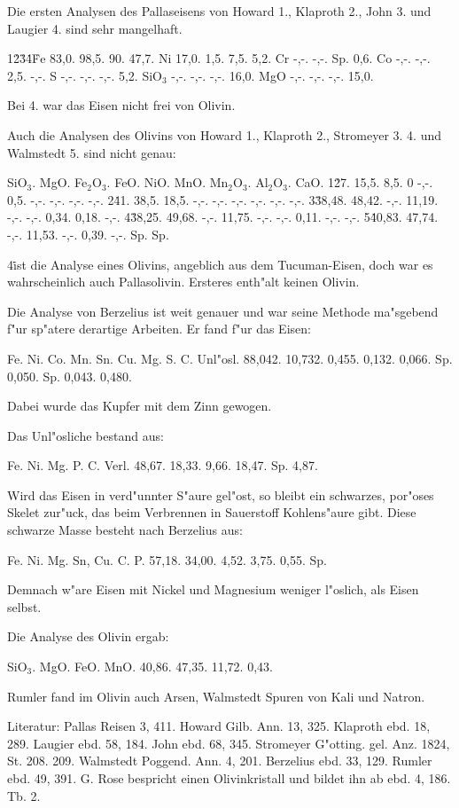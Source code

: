 \documentclass[a4paper, 11pt, oneside]{article}
\begin{document}
Die ersten Analysen des Pallaseisens von Howard 1., Klaproth 2., John 3. und Laugier 4. sind sehr mangelhaft.

1\. 2\. 3\. 4\.  
Fe 83,0. 98,5. 90. 47,7.  
Ni 17,0. 1,5. 7,5. 5,2.  
Cr -,-. -,-. Sp. 0,6.  
Co -,-. -,-. 2,5. -,-.  
S -,-. -,-. -,-. 5,2.  
SiO$_{3}$ -,-. -,-. -,-. 16,0.  
MgO -,-. -,-. -,-. 15,0.

Bei 4. war das Eisen nicht frei von Olivin.

Auch die Analysen des Olivins von Howard 1., Klaproth 2., Stromeyer 3. 4. und Walmstedt 5. sind nicht genau:

SiO$_{3}$. MgO. Fe$_{2}$O$_{3}$. FeO. NiO. MnO. Mn$_{2}$O$_{3}$. Al$_{2}$O$_{3}$. CaO.  
1\. 27. 15,5. 8,5. 0 -,-. 0,5. -,-. -,-. -,-. -,-.  
2\. 41. 38,5. 18,5. -,-. -,-. -,-. -,-. -,-. -,-.  
3\. 38,48. 48,42. -,-. 11,19. -,-. -,-. 0,34. 0,18. -,-.  
4\. 38,25. 49,68. -,-. 11,75. -,-. -,-. 0,11. -,-. -,-.  
5\. 40,83. 47,74. -,-. 11,53. -,-. 0,39. -,-. Sp. Sp.  

4\. ist die Analyse eines Olivins, angeblich aus dem Tucuman-Eisen, doch war es wahrscheinlich auch Pallasolivin. Ersteres enth"alt keinen Olivin.

Die Analyse von Berzelius ist weit genauer und war seine Methode ma"sgebend f"ur sp"atere derartige Arbeiten. Er fand f"ur das Eisen:

Fe. Ni. Co. Mn. Sn. Cu. Mg. S. C. Unl"osl.  
88,042. 10,732. 0,455. 0,132. 0,066. Sp. 0,050. Sp. 0,043. 0,480.

Dabei wurde das Kupfer mit dem Zinn gewogen.

Das Unl"osliche bestand aus:

Fe. Ni. Mg. P. C. Verl.  
48,67. 18,33. 9,66. 18,47. Sp. 4,87.

Wird das Eisen in verd"unnter S"aure gel"ost, so bleibt ein schwarzes, por"oses Skelet zur"uck, das beim Verbrennen in Sauerstoff Kohlens"aure gibt. Diese schwarze Masse besteht nach Berzelius aus:

Fe. Ni. Mg. Sn, Cu. C. P.
57,18. 34,00. 4,52. 3,75. 0,55. Sp.

Demnach w"are Eisen mit Nickel und Magnesium weniger l"oslich, als Eisen selbst.

Die Analyse des Olivin ergab:

SiO$_{3}$. MgO. FeO. MnO.  
40,86. 47,35. 11,72. 0,43.

Rumler fand im Olivin auch Arsen, Walmstedt Spuren von Kali und Natron.

\footnotesize
Literatur: Pallas Reisen 3, 411. Howard Gilb. Ann. 13, 325. Klaproth ebd. 18, 289. Laugier ebd. 58, 184. John ebd. 68, 345. Stromeyer G"otting. gel. Anz. 1824, St. 208. 209. Walmstedt Poggend. Ann. 4, 201. Berzelius ebd. 33, 129. Rumler ebd. 49, 391. G. Rose bespricht einen Olivinkristall und bildet ihn ab ebd. 4, 186. Tb. 2.
\end{document}
